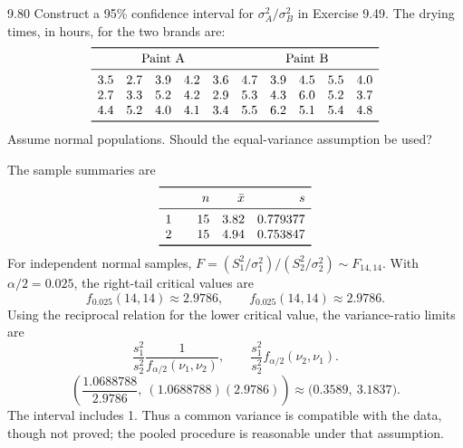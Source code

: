 \documentclass[11pt,oneside]{article}
\begin{document}
\begin{exercise}{9.80}
Construct a 95\% confidence interval for $\sigma_A^2/\sigma_B^2$ in Exercise 9.49. The drying times, in hours, for the two brands are:
\[
\begin{array}{cccccccccc}\toprule
\multicolumn{5}{c}{\text{Paint A}} & \multicolumn{5}{c}{\text{Paint B}}\\\midrule
3.5 & 2.7 & 3.9 & 4.2 & 3.6 & 4.7 & 3.9 & 4.5 & 5.5 & 4.0\\
2.7 & 3.3 & 5.2 & 4.2 & 2.9 & 5.3 & 4.3 & 6.0 & 5.2 & 3.7\\
4.4 & 5.2 & 4.0 & 4.1 & 3.4 & 5.5 & 6.2 & 5.1 & 5.4 & 4.8\\
\bottomrule\end{array}
\]
Assume normal populations. Should the equal-variance assumption be used?
\end{exercise}
\begin{solution}
The sample summaries are
\[
\begin{array}{c@{\qquad}rrr}\toprule &n&\bar x&s\\\midrule 1&15&3.82&0.779377\\2&15&4.94&0.753847\\\bottomrule\end{array}
\]
For independent normal samples, $F=(S_1^2/\sigma_1^2)/(S_2^2/\sigma_2^2)\sim F_{14,14}$. With $\alpha/2=0.025$, the right-tail critical values are
\[
f_{0.025}(14,14)\approx2.9786,\qquad f_{0.025}(14,14)\approx2.9786.
\]
Using the reciprocal relation for the lower critical value, the variance-ratio limits are
\[
\frac{s_1^2}{s_2^2}\frac1{f_{\alpha/2}(\nu_1,\nu_2)},\qquad\frac{s_1^2}{s_2^2}f_{\alpha/2}(\nu_2,\nu_1).
\]
\[
\left(\frac{1.0688788}{2.9786},\ (1.0688788)(2.9786)\right)\approx\boxed{\bigl(0.3589,\ 3.1837\bigr)}.
\]
The interval includes 1. Thus a common variance is compatible with the data, though not proved; the pooled procedure is reasonable under that assumption.
\end{solution}
\end{document}
